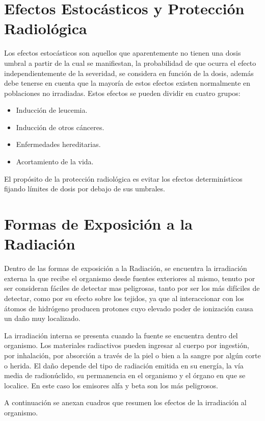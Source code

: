 \section*{Efectos Estocásticos y Protección Radiológica}

Los efectos estocásticos son aquellos que aparentemente no tienen una dosis umbral a partir de la cual se manifiestan, la probabilidad de que ocurra el efecto independientemente de la severidad, se considera en función de la dosis, además debe tenerse en cuenta que la mayoría de estos efectos existen normalmente en poblaciones no irradiadas. Estos efectos se pueden dividir en cuatro grupos:
\begin{itemize}
    \item Inducción de leucemia.
    \item Inducción de otros cánceres.
    \item Enfermedades hereditarias.
    \item Acortamiento de la vida.
\end{itemize}

El propósito de la protección radiológica es evitar los efectos determinísticos fijando límites de dosis por debajo de sus umbrales.

\section*{Formas de Exposición a la Radiación}

Dentro de las formas de exposición a la Radiación, se encuentra la irradiación externa la que recibe el organismo desde fuentes exteriores al mismo, tenuto por ser consideran fáciles de detectar mas peligrosas, tanto por ser los más difíciles de detectar, como por su efecto sobre los tejidos, ya que al interaccionar con los átomos de hidrógeno producen protones cuyo elevado poder de ionización causa un daño muy localizado.

La irradiación interna se presenta cuando la fuente se encuentra dentro del organismo. Los materiales radiactivos pueden ingresar al cuerpo por ingestión, por inhalación, por absorción a través de la piel o bien a la sangre por algún corte o herida. El daño depende del tipo de radiación emitida en su energía, la vía media de radionúclido, su permanencia en el organismo y el órgano en que se localice. En este caso los emisores alfa y beta son los más peligrosos.

A continuación se anexan cuadros que resumen los efectos de la irradiación al organismo.

